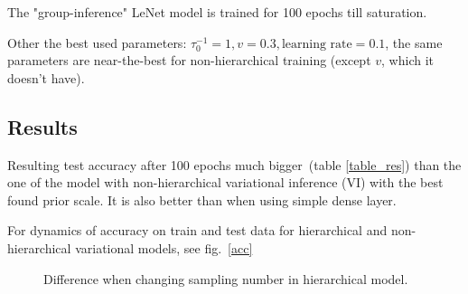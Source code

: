 \documentclass{article}
\begin{document}
The "group-inference" LeNet model is trained for 100 epochs till saturation.

Other the best used parameters: $\tau_0^{-1} = 1, v = 0.3, \text{learning rate}=0.1$, the same parameters are near-the-best for non-hierarchical training (except $v$, which it doesn't have).
\subsection*{Results}
Resulting test accuracy after 100 epochs much bigger~(table \ref{table_res}) than the one of the model with non-hierarchical variational inference (VI) with the best found prior scale. It is also better than when using simple dense layer. 

For dynamics of accuracy on train and test data for hierarchical and non-hierarchical variational models, see fig.~\ref{acc}

\begin{figure}
	\centering
	\begin{minipage}{17.5cm}
        \hfill
        \vspace{0.0cm}
		
		\caption{Difference when changing sampling number in hierarchical model.}
			\label{sampling}
	\end{minipage}
\end{figure}	
\end{document}
